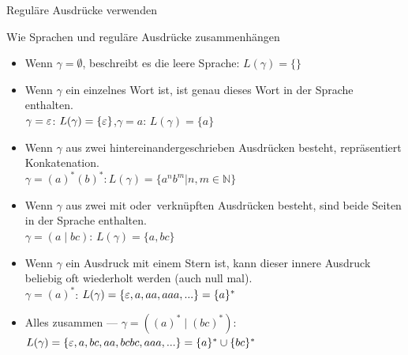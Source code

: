 \begin{frame}{Reguläre Ausdrücke verwenden}
    \begin{exampleblock}{Wie Sprachen und reguläre Ausdrücke zusammenhängen}
    \footnotesize
    \begin{itemize}[<+- | alert@+>]
        \item Wenn $\gamma = \emptyset$, beschreibt es die leere Sprache: $L(\gamma) = \{\}$
        \item Wenn $\gamma$ ein einzelnes Wort ist, ist genau dieses Wort in der Sprache enthalten.\\
        $\gamma = \varepsilon$: $L(\gamma)=\{\varepsilon\}$,\quad$\gamma = a$: $L(\gamma)=\{a\}$
        \item Wenn $\gamma$ aus zwei hintereinandergeschrieben Ausdrücken besteht, repräsentiert Konkatenation.\\
        $\gamma = (a)^*(b)^*: L(\gamma)=\{a^nb^m|n,m\in\mathbb{N}\}$
        \item Wenn $\gamma$ aus zwei mit \glqq oder\grqq\ verknüpften Ausdrücken besteht, sind beide Seiten in der Sprache enthalten.\\
        $\gamma = (a \mid bc)$: $L(\gamma)=\{a, bc\}$
        \item Wenn $\gamma$ ein Ausdruck mit einem Stern ist, kann dieser innere Ausdruck beliebig oft wiederholt werden (auch null mal).\\
        $\gamma = (a)^*$: $L(\gamma)=\{\varepsilon, a, aa, aaa, ...\}=\{a\}^*$
        \item Alles zusammen --- $\gamma = ((a)^* \mid (bc)^*)$: $L(\gamma)=\{\varepsilon, a, bc, aa, bcbc, aaa, ...\} = \{a\}^* \cup \{bc\}^*$
    \end{itemize}
    \end{exampleblock}
\end{frame}

